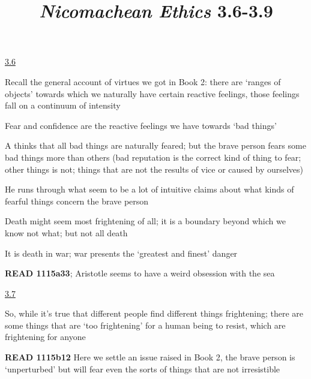 \documentclass[11pt]{article}
\title{\emph{Nicomachean Ethics} 3.6-3.9}
\author{}
\date{}
\begin{document}
\maketitle

\noindent\underline{3.6}
\vspace*{4mm}

\noindent Recall the general account of virtues we got in Book 2: there are `ranges of objects' towards which we naturally have certain reactive feelings, those feelings fall on a continuum of intensity
\vspace*{2mm}

\noindent Fear and confidence are the reactive feelings we have towards `bad things'
\vspace*{2mm}

\noindent A thinks that all bad things are naturally feared; but the brave person fears some bad things more than others (bad reputation is the correct kind of thing to fear; other things is not; things that are not the results of vice or caused by ourselves)
\vspace*{2mm}

\noindent He runs through what seem to be a lot of intuitive claims about what kinds of fearful things concern the brave person
\vspace*{2mm}

\noindent Death might seem most frightening of all; it is a boundary beyond which we know not what; but not all death
\vspace*{2mm}

\noindent It is death in war; war presents the `greatest and finest' danger
\vspace*{2mm}

\noindent\textbf{READ 1115a33}; Aristotle seems to have a weird obsession with the sea
\vspace*{4mm}

\noindent\underline{3.7}
\vspace*{4mm}

\noindent So, while it's true that different people find different things frightening; there are some things that are `too frightening' for a human being to resist, which are frightening for anyone
\vspace*{2mm}

\noindent\textbf{READ 1115b12} Here we settle an issue raised in Book 2, the brave person is `unperturbed' but will fear even the sorts of things that are not irresistible
\vspace*{2mm}
\end{document}
